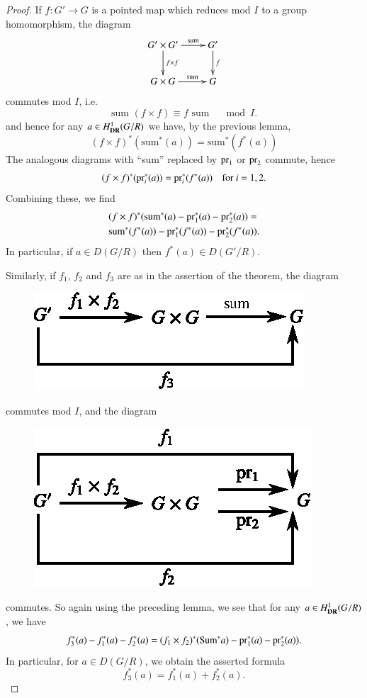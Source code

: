 \begin{proof}
If $f:G'\to G$ is a pointed map which reduces mod $I$ to a group homomorphism, the diagram
\[
\xymatrix{
G'\times G'\ar[d]^-{f\times f}\ar[r]^-{\text{sum}} & G'\ar[d]^-{f}\\
G\times G\ar[r]^-{\text{sum}} & G
}
\]
commutes mod $I$, i.e.
$$
\text{sum~} (f\times f)\equiv f\text{~sum}\quad \mod I.
$$
and hence for any $a\in H^{1}_{\mathbf{DR}}(G/R)$ we have, by the previous lemma,
$$
(f\times f)^{*}(\text{sum}^{*}(a))=\text{sum}^{*}(f^{*}(a))
$$
The analogous diagrams with ``sum'' replaced by $\operatorname{pr}_{1}$ or $\operatorname{pr}_{2}$ commute, hence
$$
(f\times f)^{*}(\operatorname{pr}_{i}^{*}(a))=\operatorname{pr}^{*}_{i}(f^{*}(a))\quad\text{for~ } i=1,2.
$$\pageoriginale
Combining these, we find
\begin{align*}
& (f\times f)^{*}(\text{sum}^{*}(a)-\operatorname{pr}^{*}_{1}(a)-\operatorname{pr}^{*}_{2}(a))=\\
& \text{sum}^{*}(f^{*}(a))-\operatorname{pr}^{*}_{1}(f^{*}(a))-\operatorname{pr}^{*}_{2}(f^{*}(a)).
\end{align*}
In particular, if $a\in D(G/R)$ then $f^{*}(a)\in D(G'/R)$.

Similarly, if $f_{1}$, $f_{2}$ and $f_{3}$ are as in the assertion of the theorem, the diagram
\begin{figure}[H]
\centering
\includegraphics{chap6/fig5.eps}
\end{figure}
commutes mod $I$, and the diagram
\begin{figure}[H]
\centering
\includegraphics{chap6/fig4.eps}
\end{figure}
commutes. So again using the preceding lemma, we see that for any $a\in H^{1}_{\mathbf{DR}}(G/R)$, we have
$$
f^{*}_{3}(a)-f^{*}_{1}(a)-f^{*}_{2}(a)=(f_{1}\times f_{2})^{*}(\text{Sum}^{*}a)-\operatorname{pr}^{*}_{1}(a)-\operatorname{pr}^{*}_{2}(a)).
$$
In particular, for $a\in D(G/R)$, we obtain the asserted formula
$$
f^{*}_{3}(a)=f^{*}_{1}(a)+f^{*}_{2}(a).
$$
\end{proof}

